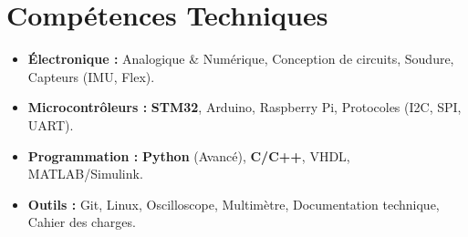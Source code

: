 \documentclass[a4paper,11pt]{article}
\begin{document}
\section{Compétences Techniques}
\begin{itemize}[leftmargin=*, nosep]
    \item \small{\textbf{Électronique :} Analogique \& Numérique, Conception de circuits, Soudure, Capteurs (IMU, Flex).}
    \item \small{\textbf{Microcontrôleurs :} \textbf{STM32}, Arduino, Raspberry Pi, Protocoles (I2C, SPI, UART).}
    \item \small{\textbf{Programmation :} \textbf{Python} (Avancé), \textbf{C/C++}, VHDL, MATLAB/Simulink.}
    \item \small{\textbf{Outils :} Git, Linux, Oscilloscope, Multimètre, Documentation technique, Cahier des charges.}
\end{itemize}

\end{document}
